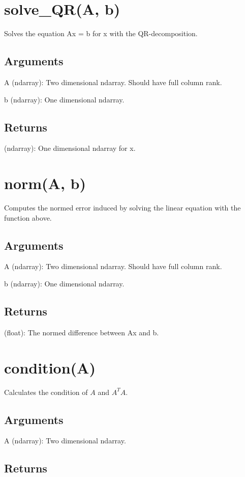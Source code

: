 \documentclass[refman]{article}
\theoremstyle{definition}
\begin{document}
\section{solve\_QR(A, b)}
Solves the equation Ax = b for x with the QR-decomposition.
\subsection*{Arguments}
A (ndarray): Two dimensional ndarray. Should have full column rank.

b (ndarray): One dimensional ndarray.
\subsection*{Returns}
(ndarray): One dimensional ndarray for x.

\section{norm(A, b)}

Computes the normed error induced by solving the linear equation with the function above.

\subsection*{Arguments}

A (ndarray): Two dimensional ndarray. Should have full column rank.

b (ndarray): One dimensional ndarray.

\subsection*{Returns}

(float): The normed difference between Ax and b.

\section{condition(A)}

Calculates the condition of $A$ and $A^T A$.

\subsection*{Arguments}

A (ndarray): Two dimensional ndarray.

\subsection*{Returns}
\end{document}
